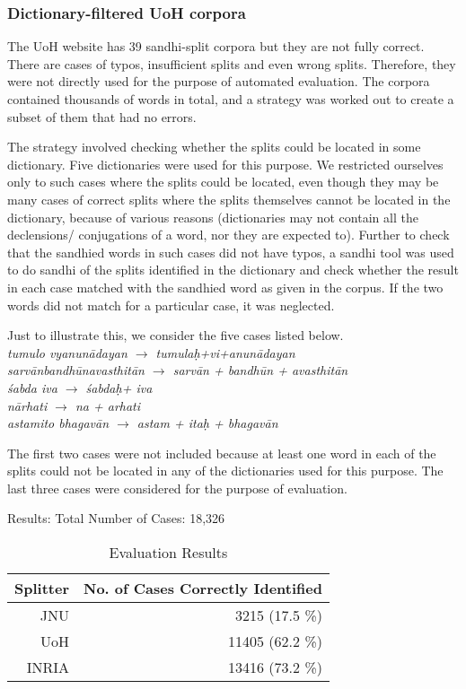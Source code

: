 \documentclass[11pt]{article}
\begin{document}
\subsubsection{Dictionary-filtered UoH corpora}
 The UoH website has 39 sandhi-split corpora but they are not fully correct. There are cases of typos, insufficient splits and even wrong splits. Therefore, they were not directly used for the purpose of automated evaluation. The corpora contained thousands of words in total, and a strategy was worked out to create a subset of them that had no errors.
 
The strategy involved checking whether the splits could be located in some dictionary. Five dictionaries were used for this purpose. We restricted ourselves only to such cases where the splits could be located, even though they may be many cases of correct splits where the splits themselves cannot be located in the dictionary, because of various reasons (dictionaries may not contain all the declensions/ conjugations of a word, nor they are expected to). Further to check that the sandhied words in such cases did not have typos, a sandhi tool was used to do sandhi of the splits identified in the dictionary and check whether the result in each case matched with the sandhied word as given in the corpus. If the two words did not match for a particular case, it was neglected.

Just to illustrate this, we consider the five cases listed below.\\
\textit{ tumulo vyanunādayan $\rightarrow$ tumulaḥ+vi+anunādayan\\
sarvānbandhūnavasthitān $\rightarrow$ sarvān + bandhūn + avasthitān\\
śabda iva $\rightarrow$ śabdaḥ+  iva\\                                              
nārhati $\rightarrow$ na + arhati\\
astamito bhagavān $\rightarrow$ astam + itaḥ + bhagavān
}

The first two cases were not included because at least one word in each of the splits could not be located in any of the dictionaries used for this purpose. The last three cases were considered for the purpose of evaluation. 


Results:
Total Number of Cases: 18,326


\begin{table}[h]
\begin{center}
\begin{tabular}{| r | r | }
\hline  \bf Splitter & \bf No. of Cases Correctly Identified \\
\hline
JNU & 3215 (17.5 \%) \\
UoH & 11405 (62.2 \%) \\
INRIA & 13416 (73.2 \%)\\
\hline
\end{tabular}
\end{center}
\caption{\label{font-table} Evaluation Results }
\end{table}
\end{document}
